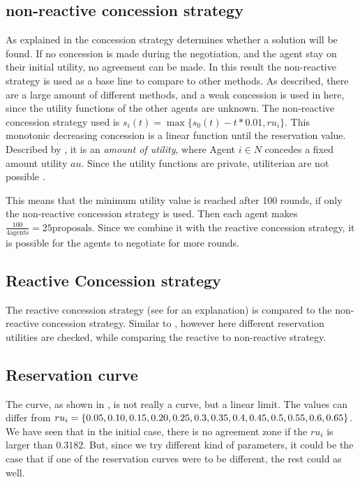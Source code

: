 \subsection{non-reactive concession strategy}
As explained in  the concession strategy determines whether a solution will be found. If no concession is made during the negotiation, and the agent stay on their initial utility, no agreement can be made. In this result the non-reactive strategy is used as a base line to compare to other methods. As described, there are a large amount of different methods, and a weak concession is used in here, since the utility functions of the other agents are unknown. The non-reactive concession strategy used is $s_i(t) = \max \{s_0(t) - t * 0.01, ru_i\}$. This monotonic decreasing concession is a linear function until the reservation value. Described by \cite{wu2009efficient}, it is an \textit{amount of utility}, where Agent $ i \in N$ concedes a fixed amount utility $au$. Since the utility functions are private, utiliterian are not possible \citep{endriss2006monotonic}. 

This means that the minimum utility value is reached after 100 rounds, if only the non-reactive concession strategy is used. Then each agent makes $\frac{100}{4 \text{agents}} = 25 \text{proposals}$. Since we combine it with the reactive concession strategy, it is possible for the agents to negotiate for more rounds.

\subsection{Reactive Concession strategy}
The reactive concession strategy (see  for an explanation) is compared to the non-reactive concession strategy. Similar to \citet{zheng2015automated}, however here different reservation utilities are checked, while comparing the reactive to non-reactive strategy.

\subsection{Reservation curve}
The curve, as shown in , is not really a curve, but a linear limit. The values can differ from 	
$ru_i = \{0.05, 0.10, 0.15, 0.20, 0.25, 0.3, 0.35, 0.4, 0.45, 0.5, \\0.55, 0.6, 0.65\}$. We have seen that in the initial case, there is no agreement zone if the $ru_i$ is larger than $0.3182$. But, since we try different kind of parameters, it could be the case that if one of the reservation curves were to be different, the rest could as well. 

